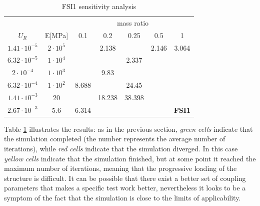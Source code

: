 %
\begin{table}[!hb]
	\begin{center}
		\begin{tabular}{ c | c | c c c c c |} 
			&  & \multicolumn{5}{c|}{mass ratio} \\
			
			$U_R$ & E[\si{MPa}] & 0.1 & 0.2 & 0.25 & 0.5 & 1 \\
			\hline
			
			$1.41\cdot 10^{-5}$ & $2\cdot 10^{5}$ & \cellcolor{green!10} & \cellcolor{green!10}2.138 & \cellcolor{green!10} & \cellcolor{green!10}2.146 & \cellcolor{green!10}3.064 \\
			$6.32\cdot 10^{-5}$ & $1\cdot 10^{4}$ & \cellcolor{green!10} & \cellcolor{green!10} & \cellcolor{green!10}2.337 & \cellcolor{red!10} & \cellcolor{red!10} \\        
			$2\cdot 10^{-4}$ & $1\cdot 10^{3}$ & \cellcolor{green!10} & \cellcolor{green!10}9.83 & \cellcolor{yellow!10} & \cellcolor{red!10} & \cellcolor{red!10} \\
			$6.32\cdot 10^{-4}$ & $1\cdot 10^{2}$ & \cellcolor{green!10}8.688 & \cellcolor{green!10} & \cellcolor{yellow!10} 24.45 & \cellcolor{red!10} & \cellcolor{red!10} \\
			$1.41\cdot 10^{-3}$ & $20$ & \cellcolor{green!10} & \cellcolor{yellow!10}18.238 & \cellcolor{yellow!10}38.398 & \cellcolor{red!10} & \cellcolor{red!10} \\
			$2.67\cdot 10^{-3}$ & $5.6$ & \cellcolor{green!10}6.314 & \cellcolor{red!10} & \cellcolor{red!10} & \cellcolor{red!10} & \cellcolor{red!10}\textbf{FSI1} \\
			\hline                        
		\end{tabular}
	\end{center}
	\caption{FSI1 sensitivity analysis}
	\label{table:FSI1-sens}
\end{table}

Table \ref{table:FSI1-sens} illustrates the results: as in the previous section, \textit{green cells} indicate that the simulation completed (the number represents the average number of iterations), while \textit{red cells} indicate that the simulation diverged. In this case \textit{yellow cells} indicate that the simulation finished, but at some point it reached the maximum number of iterations, meaning that the progressive loading of the structure is difficult. It can be possible that there exist a better set of coupling parameters that makes a specific test work better, nevertheless it looks to be a symptom of the fact that the simulation is close to the limits of applicability.

